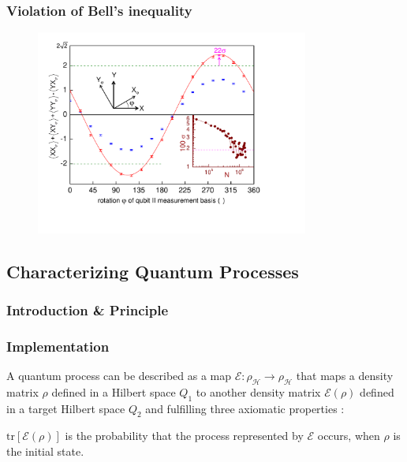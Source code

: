 \subsubsection{Violation of Bell's inequality}

\begin{figure}
	\centering
		\includegraphics[width=0.8\textwidth]{./material/papers/iswap/figures/chsh}
	\label{fig:CHSH}
	\caption{}
\end{figure}

\subsection{Characterizing Quantum Processes}

\subsubsection{Introduction \& Principle}

\subsubsection{Implementation}

A quantum process can be described as a map $\mathcal{E} : \rho_\mathcal{H} \to \rho_\mathcal{H}$ that maps a density matrix $\rho$ defined in a Hilbert space $Q_1$ to another density matrix $\mathcal{E}(\rho)$ defined in a target Hilbert space $Q_2$ and fulfilling three axiomatic properties \cite{michael_a._nielsen_quantum_2000,haroche_exploring_2006}:

\begin{axiom}
$\mathrm{tr}\left[\mathcal{E}(\rho)\right]$ is the probability that the process represented by $\mathcal{E}$ occurs, when $\rho$ is the initial state.
\end{axiom}

